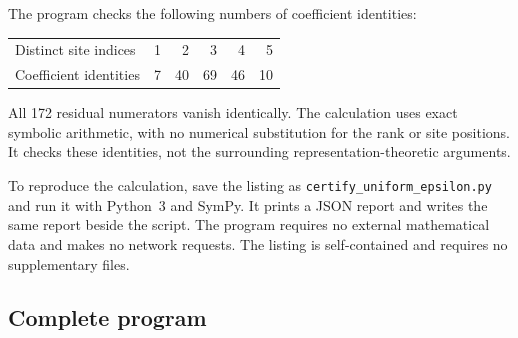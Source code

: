 \documentclass[11pt,a4paper]{article}
\numberwithin{equation}{section}
\theoremstyle{definition}\newtheorem{definition}[theorem]{Definition}
\theoremstyle{remark}\newtheorem{remark}[theorem]{Remark}
\begin{document}
The program checks the following numbers of coefficient identities:
\begin{center}
\begin{tabular}{@{}lrrrrr@{}}
\toprule
Distinct site indices & 1 & 2 & 3 & 4 & 5\\
Coefficient identities & 7 & 40 & 69 & 46 & 10\\
\bottomrule
\end{tabular}
\end{center}
All 172 residual numerators vanish identically. The calculation uses
exact symbolic arithmetic, with no numerical substitution for the rank
or site positions. It checks these identities, not the surrounding
representation-theoretic arguments.

To reproduce the calculation, save the listing as
\nolinkurl{certify_uniform_epsilon.py} and run it with Python~3 and
SymPy. It prints a JSON report and writes the same report beside the
script. The program requires no external mathematical data and makes
no network requests. The listing is self-contained and requires no supplementary files.

\subsection{Complete program}
\end{document}
